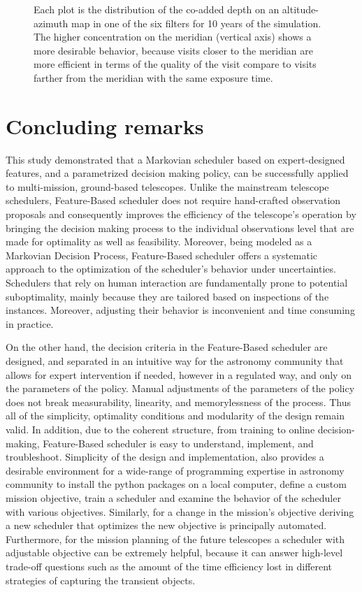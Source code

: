 \documentclass[12pt]{aastex62}
\theoremstyle{definition}
\begin{document}
\begin{figure}[h!]
\caption{Each plot is the distribution of the co-added depth on an altitude-azimuth map in one of the six filters for 10 years of the simulation. The higher concentration on the meridian (vertical axis) shows a more desirable behavior, because visits closer to the meridian are more efficient in terms of the quality of the visit compare to visits farther from the meridian with the same exposure time.}
\label{fig_10yrs_AltAz}
\end{figure}



\section{Concluding remarks}\label{sec_conclusion}

This study demonstrated that a Markovian scheduler based on expert-designed features, and a parametrized decision making policy, can be successfully applied to multi-mission, ground-based telescopes. Unlike the mainstream telescope schedulers, Feature-Based scheduler does not require hand-crafted observation proposals and consequently improves the efficiency of the telescope's operation by bringing the decision making process to the individual observations level that are made for optimality as well as feasibility. Moreover, being modeled as a Markovian Decision Process, Feature-Based scheduler offers a systematic approach to the optimization of the scheduler's behavior under uncertainties. Schedulers that rely on human interaction are fundamentally prone to potential suboptimality, mainly because they are tailored based on inspections of the instances. Moreover, adjusting their behavior is inconvenient and time consuming in practice. 


On the other hand, the decision criteria in the Feature-Based scheduler are designed, and separated in an intuitive way for the astronomy community that allows for expert intervention if needed, however in a regulated way, and only on the parameters of the policy. Manual adjustments of the parameters of the policy does not break measurability, linearity, and memorylessness of the process. Thus all of the simplicity, optimality conditions and modularity of the design remain valid. In addition, due to the coherent structure, from training to online decision-making, Feature-Based scheduler is easy to understand, implement, and troubleshoot. Simplicity of the design and implementation, also provides a desirable environment for a wide-range of programming expertise in astronomy community to install the python packages on a local computer, define a custom mission objective, train a scheduler and examine the behavior of the scheduler with various objectives. Similarly, for a change in the mission's objective deriving a new scheduler that optimizes the new objective is principally automated. Furthermore, for the mission planning of the future telescopes a scheduler with adjustable objective can be extremely helpful, because it can answer high-level trade-off questions such as the amount of the time efficiency lost in different strategies of capturing the transient objects. 
\end{document}
